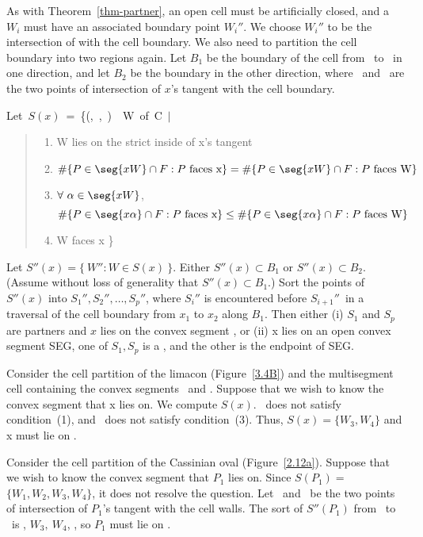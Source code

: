 As with Theorem~\ref{thm-partner}, an open cell must be artificially closed,
and a \wallpoint\ $W_{i}$ must have an associated boundary point $W_{i}''$.
We choose $W_{i}''$ to be the intersection of  with the cell boundary.
We also need to partition the cell boundary into two regions again.
Let $B_{1}$ be the boundary of the cell from \xo\ to \xt\ in one direction, 
and let $B_{2}$ be the boundary in the other direction, where
\xo\ and \xt\ are the two points of intersection of 
$x$'s tangent with the cell boundary.
%
\begin{theorem}
\label{thm-parents}
\mbox{Let $S(x)$ = \{(\original, \pseudoalone, \artificial) \wallpoints\ W of C $\mid$}
\begin{quote}
\begin{enumerate}
\item W lies on the strict inside of x's tangent
\item \mbox{$\#\{P \in\seg{xW}\cap F: P \mbox{ faces x}\} =
\#\{P \in \seg{xW}\cap F: P \mbox{ faces W} \}$}
\item $\forall\ \alpha \in \seg{xW}$,
\[ \#\{P \in\seg{x\alpha}\cap F: P \mbox{ faces x}\} \leq
\#\{P \in \seg{x\alpha}\cap F: P \mbox{ faces W}\} \]
\item W faces x \}
\end{enumerate}
\end{quote}
Let $S''(x) = \{\ W'' : W \in S(x)\ \}$.
Either $S''(x) \subset B_{1}$ or $S''(x) \subset B_{2}$.
(Assume without loss of generality that $S''(x) \subset B_{1}$.)
Sort the points of $S''(x)$ into $S_{1}'',S_{2}'',\ldots,S_{p}''$,
where $S_{i}''$ is encountered before $S_{i+1}''$\ in a traversal of the
cell boundary from $x_{1}$ to $x_{2}$ along $B_{1}$.
Then either (i) $S_{1}$ and $S_{p}$ are partners and $x$ lies on the convex segment
, or (ii)
x lies on an open convex segment SEG, one of $S_{1},S_{p}$ is a
\artificialcurvepoint, and the other is the endpoint of SEG.
\end{theorem}
%
\begin{example}
Consider the cell partition of the limacon (Figure~\ref{3.4B})
and the multisegment cell containing the convex segments
\wwa\ and .
Suppose that we wish to know the convex segment that x lies on.
We compute $S(x)$.
\wo\ does not satisfy condition~(1), and \wt\ does not satisfy condition~(3).
Thus, $S(x) = \{W_{3},W_{4}\}$ and x must lie on .

Consider the cell partition of the Cassinian oval (Figure~\ref{2.12a}).
Suppose that we wish to know the convex segment that $P_{1}$ lies on.
Since $S(P_{1}) =$\\
$\{W_{1},W_{2},W_{3},W_{4}\}$, it does not resolve the
question.
Let \xo\ and \xt\ be the two points of intersection of $P_{1}$'s tangent 
with the cell walls.
The sort of $S''(P_{1})$
from \xo\ to \xt\ is \wo, $W_{3},\ W_{4}$, \wt, so $P_{1}$ must lie on \wwa.
\end{example}
